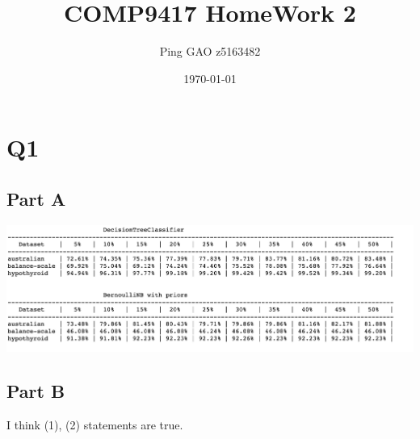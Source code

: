 \documentclass[12pt]{article}
\title{COMP9417 HomeWork 2}
\author{Ping GAO z5163482}
\date{\today}
\begin{document}
    \maketitle
    \section{Q1}\label{sec:q1}
    \subsection{Part A}\label{subsec:part-a}
    \includegraphics[scale=0.18]{result.jpeg}
    \subsection{Part B}\label{subsec:part-b}
    I think (1), (2) statements are true.
\end{document}
